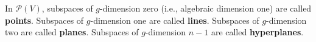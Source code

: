 In $\mathcal{P}(V)$, subspaces of $g$-dimension zero (i.e., algebraic dimension one) are called \textbf{points}. Subspaces of $g$-dimension one are called \textbf{lines}. Subspaces of $g$-dimension two are called \textbf{planes}. Subspaces of $g$-dimension $n-1$ are called \textbf{hyperplanes}.
